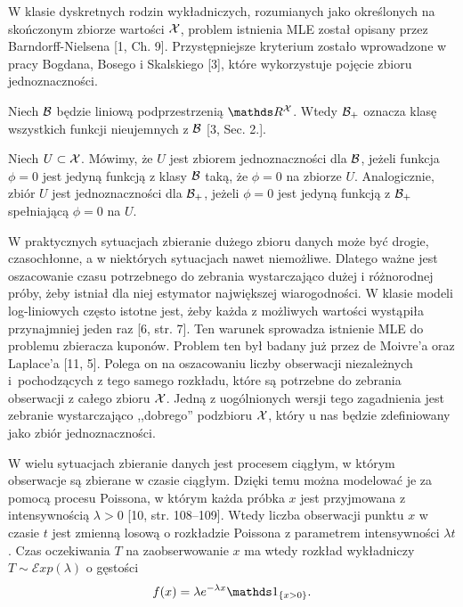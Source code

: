 \noindent
W klasie dyskretnych rodzin wykładniczych, rozumianych jako określonych na skończonym zbiorze wartości $\mathcal{X}$, problem istnienia MLE został opisany przez Barndorff-Nielsena [1, Ch. 9]. Przystępniejsze kryterium zostało wprowadzone w pracy Bogdana, Bosego i Skalskiego [3], które wykorzystuje pojęcie zbioru jednoznaczności. 

\noindent
Niech $\mathcal{B}$ będzie liniową podprzestrzenią $\R^{\set{X}}$. Wtedy $\mathcal{B}_+$ oznacza klasę wszystkich funkcji nieujemnych z $\mathcal{B}$ [3, Sec. 2.].

\begin{definition} [3, Sec. 2.]
Niech $U\subset \mathcal{X}$. Mówimy, że $U$ jest zbiorem jednoznaczności dla $\mathcal{B}$, jeżeli funkcja $\phi=0$ jest jedyną funkcją z klasy $\mathcal{B}$ taką, że $\phi = 0$ na zbiorze $U$. Analogicznie, zbiór $U$ jest jednoznaczności dla $\mathcal{B}_+$, jeżeli $\phi=0$ jest jedyną funkcją z $\mathcal{B}_+$ spełniającą $\phi = 0$ na $U$.    
\end{definition}

\noindent
W praktycznych sytuacjach zbieranie dużego zbioru danych może być drogie, czasochłonne, a w niektórych sytuacjach nawet niemożliwe. Dlatego ważne jest oszacowanie czasu potrzebnego do zebrania wystarczająco dużej i różnorodnej próby, żeby istniał dla niej estymator największej wiarogodności. W klasie modeli log-liniowych często istotne jest, żeby każda z możliwych wartości wystąpiła przynajmniej jeden raz [6, str. 7]. Ten warunek sprowadza istnienie MLE do problemu zbieracza kuponów. Problem ten był badany już przez de Moivre'a oraz Laplace'a [11, 5]. Polega on na oszacowaniu liczby obserwacji niezależnych i~pochodzących z tego samego rozkładu, które są potrzebne do zebrania obserwacji z całego zbioru $\mathcal{X}$. Jedną z uogólnionych wersji tego zagadnienia jest zebranie wystarczająco ,,dobrego'' podzbioru $\mathcal{X}$, który u nas będzie zdefiniowany jako zbiór jednoznaczności.

\noindent
W wielu sytuacjach zbieranie danych jest procesem ciągłym, w którym obserwacje są zbierane w czasie ciągłym. Dzięki temu można modelować je za pomocą procesu Poissona, w którym każda próbka $x$ jest przyjmowana z intensywnością $\lambda>0$ [10, str. 108--109]. Wtedy liczba obserwacji punktu $x$ w czasie $t$ jest zmienną losową o rozkładzie Poissona z parametrem intensywności $\lambda t$. Czas oczekiwania $T$ na zaobserwowanie $x$ ma wtedy rozkład wykładniczy  $T\sim \mathcal{E}xp(\lambda)$ o gęstości 
$$
f(x) = \lambda e^{-\lambda x}\one_{\{x>0\}}.
$$

